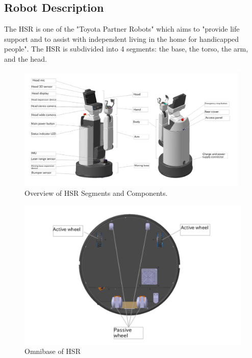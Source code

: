 \documentclass[11pt]{article}
\begin{document}
    \subsection{Robot Description}
        The HSR is one of the "Toyota Partner Robots" which aims to "provide life support and to assist with independent living in the home for handicapped people"\cite{noauthor_hsrb_manual_nodate}. The HSR is subdivided into 4 segments: the base, the torso, the arm, and the head. 
        \begin{figure}[ht]
            \includegraphics[width=\linewidth]{2020.05.07/hsr_overview.png}
            \centering
            \caption{Overview of HSR Segments and Components.\cite{noauthor_hsrb_manual_nodate}}
            \label{fig:hsrOverview}
        \end{figure}

        \begin{figure}[ht]
            \includegraphics[width=0.60\linewidth]{2020.05.07/hsr_base.png}
            \centering
            \caption{Omnibase of HSR \cite{noauthor_hsrb_manual_nodate}}
            \label{fig:hsrBase}
        \end{figure}

\end{document}
